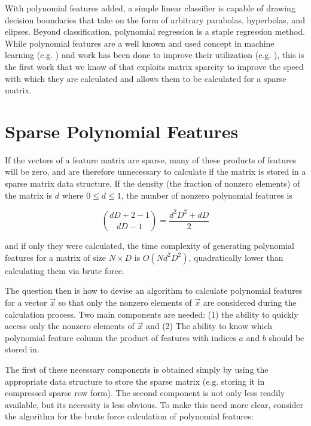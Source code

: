 \documentclass[11pt,onecolumn]{article}
\begin{document}
With polynomial features added, a simple linear classifier is capable of drawing decision boundaries
that take on the form of arbitrary parabolas, hyperbolas, and elipses. Beyond classification, polynomial regression \cite{theoryoflinearmodels} is a staple regression method.
While polynomial features are a well known and used concept in machine learning (e.g. \cite{pavlidis2002learning, konidaris2009skill, wiesler2009investigations}) and work has been done to improve their utilization (e.g. \cite{pevckov2008minimal, huang2010predicting}), this is the first work that we know of that exploits matrix sparcity 
to improve the speed with which they are calculated and allows them to be calculated for a sparse matrix.


\section{Sparse Polynomial Features} \label{sec:sparse}
If the vectors of a feature matrix are sparse, many of these products of features will be
zero, and are therefore unnecessary to calculate if the matrix is stored in a sparse matrix 
data structure. If the density (the fraction of nonzero elements) of the matrix is $d$ where $0 \le d \le 1$,
the number of nonzero polynomial features is

\begin{equation*}
\binom{dD+2-1}{dD-1} = \frac{d^2D^2+dD}{2}
\end{equation*}

and if only they were calculated, the time complexity of generating polynomial features
for a matrix of size $N \times D$ is $O(Nd^2D^2)$, quadratically lower than calculating them via brute force.

The question then is how to devise an algorithm to calculate polynomial features for a vector $\vec{x}$ so that
only the nonzero elements of $\vec{x}$ are considered during the calculation process. Two main components are needed: (1) the ability to
quickly access only the nonzero elements of $\vec{x}$ and (2) The ability to know which polynomial feature column
the product of features with indices $a$ and $b$ should be stored in.

The first of these necessary components is obtained simply by using the appropriate data structure
to store the sparse matrix (e.g. storing it in compressed sparse row form). The second component 
is not only less readily available, but its necessity is less obvious. To make this need more clear, consider the
algorithm for the brute force calculation of polynomial features:
\end{document}
